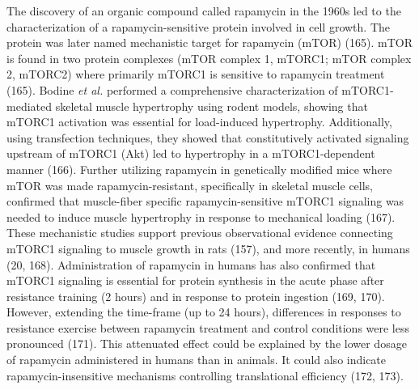 \documentclass[twoside,10pt]{gihclass} %
\begin{document}
The discovery of an organic compound called rapamycin in the 1960s led to the characterization of a rapamycin-sensitive protein involved in cell growth. The protein was later named mechanistic target for rapamycin (mTOR)
(165).
mTOR is found in two protein complexes (mTOR complex 1, mTORC1; mTOR complex 2, mTORC2) where primarily mTORC1 is sensitive to rapamycin treatment
(165).
Bodine \emph{et al.} performed a comprehensive characterization of mTORC1-mediated skeletal muscle hypertrophy using rodent models, showing that mTORC1 activation was essential for load-induced hypertrophy. Additionally, using transfection techniques, they showed that constitutively activated signaling upstream of mTORC1 (Akt) led to hypertrophy in a mTORC1-dependent manner
(166).
Further utilizing rapamycin in genetically modified mice where mTOR was made rapamycin-resistant, specifically in skeletal muscle cells, confirmed that muscle-fiber specific rapamycin-sensitive mTORC1 signaling was needed to induce muscle hypertrophy in response to mechanical loading
(167).
These mechanistic studies support previous observational evidence connecting mTORC1 signaling to muscle growth in rats
(157),
and more recently, in humans
(20, 168).
Administration of rapamycin in humans has also confirmed that mTORC1 signaling is essential for protein synthesis in the acute phase after resistance training (2 hours) and in response to protein ingestion
(169, 170).
However, extending the time-frame (up to 24 hours), differences in responses to resistance exercise between rapamycin treatment and control conditions were less pronounced
(171).
This attenuated effect could be explained by the lower dosage of rapamycin administered in humans than in animals.
It could also indicate rapamycin-insensitive mechanisms controlling translational efficiency
(172, 173).
\end{document}
